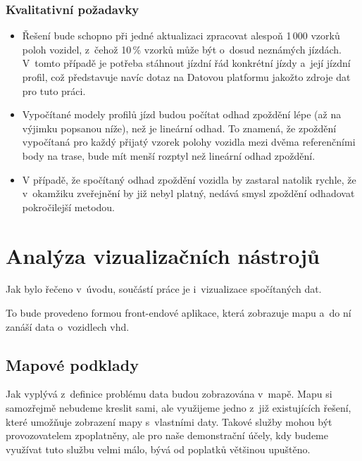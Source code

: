 \subsubsection{Kvalitativní požadavky} \label{subsubsection:kvalitativni_pozadavky}


\begin{itemize}

\item
Řešení bude schopno při jedné aktualizaci zpracovat alespoň 1\,000 vzorků poloh vozidel, z~čehož 10\,\% vzorků může být o~dosud neznámých jízdách. V~tomto případě je potřeba stáhnout jízdní řád konkrétní jízdy a~její jízdní profil, což představuje navíc dotaz na Datovou platformu jakožto zdroje dat pro tuto práci.

\item
Vypočítané modely profilů jízd budou počítat odhad zpoždění lépe (až na výjimku popsanou níže), než je lineární odhad. To znamená, že zpoždění vypočítaná pro každý přijatý vzorek polohy vozidla mezi dvěma referenčními body na trase, bude mít menší rozptyl než lineární odhad zpoždění.

\item
V případě, že spočítaný odhad zpoždění vozidla by zastaral natolik rychle, že v~okamžiku zveřejnění by již nebyl platný, nedává smysl zpoždění odhadovat pokročilejší metodou.


\end{itemize}

\section{Analýza vizualizačních nástrojů}

Jak bylo řečeno v~úvodu, součástí práce je i~vizualizace spočítaných dat.

\bigbreak

To bude provedeno formou front-endové aplikace, která zobrazuje mapu a~do ní zanáší data o~vozidlech \gls{vhd}.

\subsection{Mapové podklady}

Jak vyplývá z~definice problému data budou zobrazována v~mapě. Mapu si samozřejmě nebudeme kreslit sami, ale využijeme jedno z~již existujících řešení, které umožňuje zobrazení mapy s~vlastními daty. Takové služby mohou být provozovatelem zpoplatněny, ale pro naše demonstrační účely, kdy budeme využívat tuto službu velmi málo, bývá od poplatků většinou upuštěno.

